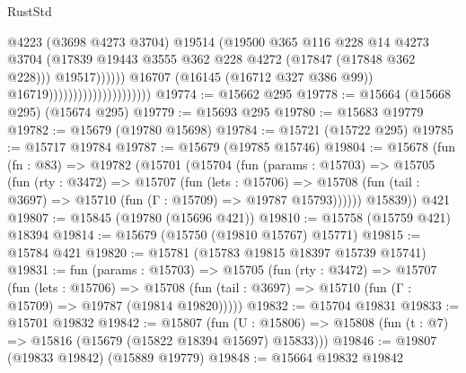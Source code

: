 \begin{lexlean}{RustStd}
\begin{coremodule}
                                                        @4223
                                                        (@3698 @4273 @3704)
                                                        @19514
                                                        (@19500
                                                          @365
                                                          @116
                                                          @228
                                                          @14
                                                          @4273
                                                          @3704
                                                          (@17839
                                                            @19443
                                                            @3555
                                                            @362
                                                            @228
                                                            @4272
                                                            (@17847 (@17848 @362 @228)))
                                                          @19517))))))
                                              @16707
                                              (@16145 (@16712 @327 @386 @99))
                                              @16719)))))))))))))))))))))
@19774 := @15662 @295
@19778 := @15664 (@15668 @295) (@15674 @295)
@19779 := @15693 @295
@19780 := @15683 @19779
@19782 := @15679 (@19780 @15698)
@19784 := @15721 (@15722 @295)
@19785 := @15717 @19784
@19787 := @15679 (@19785 @15746)
@19804 := @15678
    (fun (fn : @83) =>
    @19782
      (@15701
        (@15704
          (fun (params : @15703) =>
          @15705
            (fun (rty : @3472) =>
            @15707
              (fun (lets : @15706) =>
              @15708 (fun (tail : @3697) => @15710 (fun (Γ : @15709) => @19787 @15793))))))
        @15839))
    @421
@19807 := @15845 (@19780 (@15696 @421))
@19810 := @15758 (@15759 @421) @18394
@19814 := @15679 (@15750 (@19810 @15767) @15771)
@19815 := @15784 @421
@19820 := @15781 (@15783 @19815 @18397 @15739 @15741)
@19831 := fun (params : @15703) =>
  @15705
    (fun (rty : @3472) =>
    @15707
      (fun (lets : @15706) =>
      @15708 (fun (tail : @3697) => @15710 (fun (Γ : @15709) => @19787 (@19814 @19820)))))
@19832 := @15704 @19831
@19833 := @15701 @19832
@19842 := @15807
    (fun (U : @15806) => @15808 (fun (t : @7) => @15816 (@15679 (@15822 @18394 @15697) @15833)))
@19846 := @19807 (@19833 @19842) (@15889 @19779)
@19848 := @15664 @19832 @19842

\end{coremodule}
\end{lexlean}
